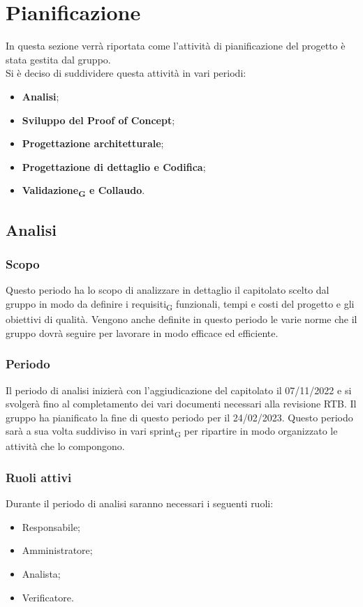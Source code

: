 \section{Pianificazione}
In questa sezione verrà riportata come l'attività di pianificazione del progetto è stata gestita dal gruppo.\\
Si è deciso di suddividere questa attività in vari periodi:
\begin{itemize}
	\item \textbf{Analisi};
	\item \textbf{Sviluppo del Proof of Concept};
	\item \textbf{Progettazione architetturale};
    \item \textbf{Progettazione di dettaglio e Codifica};
	\item \textbf{Validazione\textsubscript{G} e Collaudo}.
\end{itemize}

\subsection{Analisi}
\subsubsection{Scopo}
Questo periodo ha lo scopo di analizzare in dettaglio il capitolato scelto dal gruppo in modo da definire i requisiti\textsubscript{G} funzionali, tempi e costi del progetto e gli obiettivi di qualità. Vengono anche definite in questo periodo le varie norme che il gruppo dovrà seguire per lavorare in modo efficace ed efficiente.

\subsubsection{Periodo}
Il periodo di analisi inizierà con l'aggiudicazione del capitolato il 07/11/2022 e si svolgerà fino al completamento dei vari documenti necessari alla revisione  RTB. Il gruppo ha pianificato la fine di questo periodo per il 24/02/2023. Questo periodo sarà a sua volta suddiviso in vari sprint\textsubscript{G} per ripartire in modo organizzato le attività che lo compongono.

\subsubsection{Ruoli attivi}
Durante il periodo di analisi saranno necessari i seguenti ruoli:
\begin{itemize}
	\item Responsabile;
	\item Amministratore;
	\item Analista;
	\item Verificatore.
\end{itemize}

